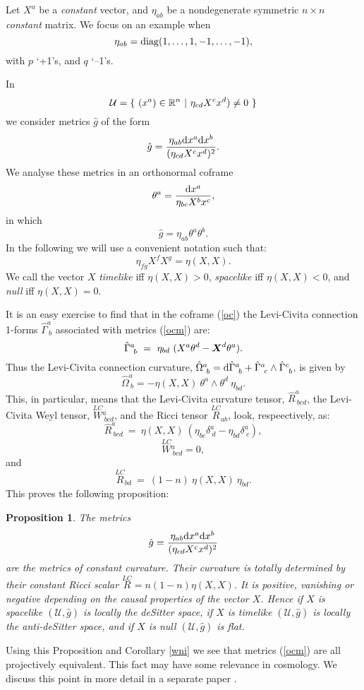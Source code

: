 \documentclass[letterpaper]{amsart}
\newtheorem{proposition}[theorem]{Proposition}
\theoremstyle{definition}
\theoremstyle{remark}
\newcommand{\be}{\begin{equation}}
\newcommand{\ee}{\end{equation}}
\newcommand{\weyl}{{\stackrel{\scriptscriptstyle{LC}}{W}}\phantom{}}
\newcommand{\rlc}{{\stackrel{\scriptscriptstyle{LC}}{R}}}
\newcommand{\dz}{\wedge}
\newcommand{\der}{{\rm d}}
\newcommand{\X}{\mbox{\boldmath{$ X$}}}
\begin{document}
Let $X^a$ be a \emph{constant} vector, 
and $\eta_{ab}$ be a nondegenerate symmetric $n\times n$ \emph{constant}
matrix. We focus on an example when   
$$\eta_{ab}={\rm diag}(1,\dots,1,-1,\dots,-1),$$
with $p$ `+1's, and $q$ `--1's.

In 
$${\mathcal U}=\{~(x^a)\in\mathbb{R}^n ~|~\eta_{cd}X^cx^d)\neq 0~\}$$ 
we consider metrics $\hat{g}$ of the form
\be
\hat{g}=\frac{\eta_{ab}\der x^a\der x^b}{(\eta_{cd}X^cx^d)^2}.\label{ocm}\ee
We analyse these metrics in an orthonormal coframe 
\be
\theta^a=\frac{\der x^a}{\eta_{bc}X^bx^c},\label{oc}\ee
in which 
$$\hat{g}=\eta_{ab}\theta^a\theta^b.$$
In the following we will use a convenient notation such that: 
$$\eta_{fg}X^fX^g=\eta(X,X).$$ 
We call the vector $X$ \emph{timelike} iff $\eta(X,X)>0$, \emph{spacelike} iff
$\eta(X,X)<0$, and \emph{null} iff $\eta(X,X)=0$.
 
It is an easy exercise to find that in the coframe (\ref{oc}) the Levi-Civita
connection 1-forms $\hat{\Gamma}^a_{~b}$ associated with metrics (\ref{ocm})
are:
$$\hat{\Gamma}^a_{~b}~=~\eta_{bd}~(X^a\theta^d-\X^d\theta^a).$$
Thus the Levi-Civita connection curvature, $\hat{\Omega}^a_{~b}=\der
\hat{\Gamma}^a_{~b}+\hat{\Gamma}^a_{~c}\dz\hat{\Gamma}^c_{~b}$, is
given by 
$$\hat{\Omega}^a_{~b}=-\eta(X,X)~\theta^a\dz\theta^d~\eta_{bd}.$$
This, in particular, means that the Levi-Civita curvature tensor, $\hat{R}^a_{~bcd}$, the
Levi-Civita Weyl tensor, $\weyl^a_{~bcd}$,   
and the Ricci tensor $\rlc_{ab}$, look,
respeectively, as:
$$\hat{R}^a_{~bcd}~=~\eta(X,X)~(\eta_{bc}\delta^a_{~d}-\eta_{bd}\delta^a_{~c}),$$
$$\weyl^a_{~bcd}=0,$$
and
$$\rlc_{bd}~=~(1-n)~\eta(X,X)~\eta_{bd}.$$
This proves the following proposition:
\begin{proposition}
The metrics $$\hat{g}=\frac{\eta_{ab}\der x^a\der
  x^b}{(\eta_{cd}X^cx^d)^2}$$ are the metrics of constant
curvature. Their curvature is  
totally determined by their constant Ricci scalar
$\rlc=n(1-n)\eta(X,X)$. It is positive,
vanishing or negative depending on the causal properties of the vector
$X$. Hence if $X$ is spacelike $({\mathcal U},\hat{g})$ is locally
the deSitter space, if  $X$ is timelike $({\mathcal U},\hat{g})$ is locally
the anti-deSitter space, and if $X$ is null $({\mathcal U},\hat{g})$ is flat.
\end{proposition}
Using this Proposition and Corollary \ref{wni} we see that metrics
(\ref{ocm}) are all projectively equivalent. This fact may have some
relevance in cosmology. We discuss this point in more detail in a
separate paper \cite{nur}.
\end{document}
